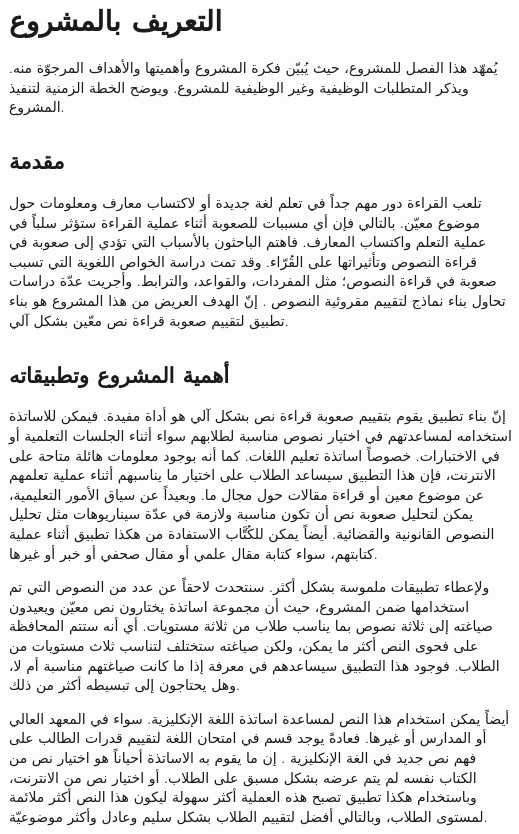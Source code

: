 

\chapter{التعريف بالمشروع}
يُمهّد هذا الفصل للمشروع،
حيث يُبيّن فكرة المشروع وأهميتها والأهداف المرجوّة منه.
ويذكر المتطلبات الوظيفية وغير الوظيفية للمشروع.
ويوضح الخطة الزمنية لتنفيذ المشروع.



\section{مقدمة}
تلعب القراءة دور مهم جداً في تعلم لغة جديدة أو لاكتساب معارف ومعلومات حول موضوع معيّن.
بالتالي فإن أي مسببات للصعوبة أثناء عملية القراءة ستؤثر سلباً في عملية التعلم واكتساب المعارف.
فاهتم الباحثون بالأسباب التي تؤدي إلى صعوبة في قراءة النصوص وتأثيراتها على القُرّاء.
وقد تمت دراسة الخواص اللغوية التي تسبب صعوبة في قراءة النصوص؛
مثل المفردات، والقواعد، والترابط.
وأجريت عدّة دراسات تحاول بناء نماذج لتقييم مقروئية النصوص .
إنّ الهدف العريض من هذا المشروع هو بناء تطبيق لتقييم صعوبة قراءة نص معّين بشكل آلي.

\section{أهمية المشروع وتطبيقاته}
إنّ بناء تطبيق يقوم بتقييم صعوبة قراءة نص بشكل آلي هو أداة مفيدة.
فيمكن للاساتذة استخدامه لمساعدتهم في اختيار نصوص مناسبة لطلابهم سواء أثناء الجلسات التعلمية أو في الاختبارات.
خصوصاً اساتذة تعليم اللغات.
كما أنه بوجود معلومات هائلة متاحة على الانترنت،
فإن هذا التطبيق سيساعد الطلاب على اختيار ما يناسبهم أثناء عملية تعلمهم عن موضوع معين أو قراءة مقالات حول مجال ما.
وبعيداً عن سياق الأمور التعليمية،
يمكن لتحليل صعوبة نص أن تكون مناسبة ولازمة في عدّة سيناريوهات مثل تحليل النصوص القانونية والقضائية.
أيضاً يمكن للكُتَّاب الاستفادة من هكذا تطبيق أثناء عملية كتابتهم، سواء كتابة مقال علمي أو مقال صحفي أو خبر أو غيرها.

ولإعطاء تطبيقات ملموسة بشكل أكثر.
سنتحدث لاحقاً عن عدد من النصوص التي تم استخدامها ضمن المشروع،
حيث أن مجموعة اساتذة يختارون نص معيّن ويعيدون صياغته إلى ثلاثة نصوص بما يناسب طلاب من ثلاثة مستويات.
أي أنه ستتم المحافظة على فحوى النص أكثر ما يمكن، ولكن صياغته ستختلف لتناسب ثلاث مستويات من الطلاب.
فوجود هذا التطبيق سيساعدهم في معرفة إذا ما كانت صياغتهم مناسبة أم لا، وهل يحتاجون إلى تبسيطه أكثر من ذلك.

أيضاً يمكن استخدام هذا النص لمساعدة اساتذة اللغة الإنكليزية.
سواء في المعهد العالي أو المدارس أو غيرها.
فعادةً يوجد قسم في امتحان اللغة لتقييم قدرات الطالب على فهم نص جديد في الغة الإنكليزية .
إن ما يقوم به الاساتذة أحياناً هو اختيار نص من الكتاب نفسه لم يتم عرضه بشكل مسبق على الطلاب.
أو اختيار نص من الانترنت، وباستخدام هكذا تطبيق تصبح هذه العملية أكثر سهولة ليكون هذا النص أكثر ملائمة لمستوى الطلاب،
وبالتالي أفضل لتقييم الطلاب بشكل سليم وعادل وأكثر موضوعيّة.

